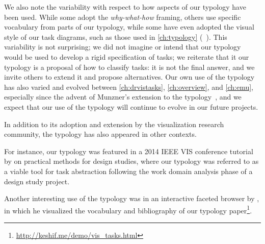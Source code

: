 We also note the variability with respect to how aspects of our typology have been used.
While some adopt the {\it why-what-how} framing, others use specific vocabulary from parts of our typology, while some have even adopted the visual style of our task diagrams, such as those used in \autoref{ch:typology} (\eg ~\cite{Jackle2015,Vanderwoning2014}).
This variability is not surprising; we did not imagine or intend that our typology would be used to develop a rigid specification of tasks; we reiterate that it our typology is a proposal of how to classify tasks: it is not the final answer, and we invite others to extend it and propose alternatives.
Our own use of the typology has also varied and evolved between \autoref{ch:drvistasks}, \autoref{ch:overview}, and \autoref{ch:emu}, especially since the advent of Munzner's extension to the typology~\cite{Munzner2014}, and we expect that our use of the typology will continue to evolve in our future projects.

In addition to its adoption and extension by the visualization research community, the typology has also appeared in other contexts.

For instance, our typology was featured in a 2014 IEEE VIS conference tutorial by \citet{McNamara2014} on practical methods for design studies, where our typology was referred to as a viable tool for task abstraction following the work domain analysis phase of a design study project.

Another interesting use of the typology was in an interactive faceted browser by \citet{Yalcin2014}, in which he visualized the vocabulary and bibliography of our typology paper\footnote{\url{http://keshif.me/demo/vis_tasks.html}}.

